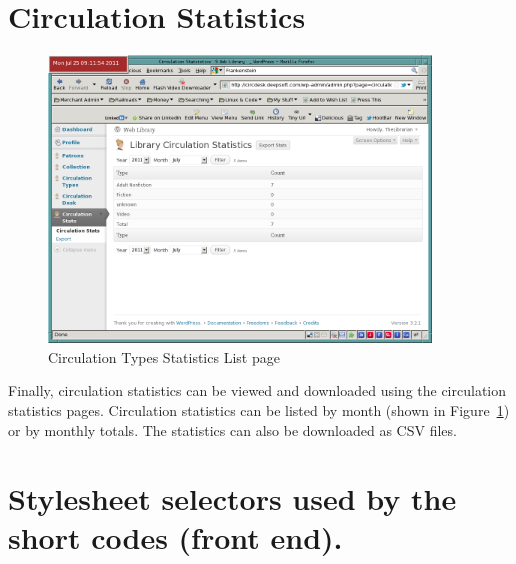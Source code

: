 \documentclass[letterpaper,twoside]{article}
\begin{document}
\section{Circulation Statistics}

\begin{figure}[htbp]
\begin{centering}
\includegraphics[width=4in]{CirculationTypesStatsList.png}
\caption{Circulation Types Statistics List page}
\label{fig:CirculationTypesStatsList}
\end{centering}
\end{figure}
Finally, circulation statistics can be viewed and downloaded using the
circulation statistics pages. Circulation statistics can be listed by
month (shown in Figure~\ref{fig:CirculationTypesStatsList}) or by
monthly totals.  The statistics can also be downloaded as CSV files.

\appendix

\section{Stylesheet selectors used by the short codes (front end).}
\end{document}
